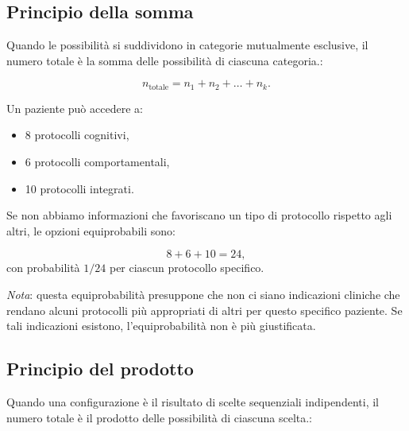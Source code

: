 \documentclass[
  italian,
  letterpaper,
  a4paper,
  11pt,
  open=any]{scrbook}
\providecommand{\tightlist}{%
  \setlength{\itemsep}{0pt}\setlength{\parskip}{0pt}}
\theoremstyle{plain}
\theoremstyle{definition}
\theoremstyle{definition}
\theoremstyle{remark}
\begin{document}
\subsection{Principio della somma}\label{principio-della-somma}

Quando le possibilità si suddividono in categorie mutualmente esclusive,
il numero totale è la somma delle possibilità di ciascuna categoria.:

\[
n_{\text{totale}} = n_1 + n_2 + \dots + n_k.
\]

\begin{tcolorbox}[enhanced jigsaw, arc=.35mm, bottomrule=.15mm, bottomtitle=1mm, breakable, colback=white, colbacktitle=quarto-callout-note-color!10!white, colframe=quarto-callout-note-color-frame, coltitle=black, left=2mm, leftrule=.75mm, opacityback=0, opacitybacktitle=0.6, rightrule=.15mm, title=\textcolor{quarto-callout-note-color}{\faInfo}\hspace{0.5em}{Esempio psicologico}, titlerule=0mm, toprule=.15mm, toptitle=1mm]

Un paziente può accedere a:

\begin{itemize}
\tightlist
\item
  8 protocolli cognitivi,
\item
  6 protocolli comportamentali,
\item
  10 protocolli integrati.
\end{itemize}

Se non abbiamo informazioni che favoriscano un tipo di protocollo
rispetto agli altri, le opzioni equiprobabili sono:

\[
8 + 6 + 10 = 24,
\] con probabilità \(1/24\) per ciascun protocollo specifico.

\emph{Nota}: questa equiprobabilità presuppone che non ci siano
indicazioni cliniche che rendano alcuni protocolli più appropriati di
altri per questo specifico paziente. Se tali indicazioni esistono,
l'equiprobabilità non è più giustificata.

\end{tcolorbox}

\subsection{Principio del prodotto}\label{principio-del-prodotto}

Quando una configurazione è il risultato di scelte sequenziali
indipendenti, il numero totale è il prodotto delle possibilità di
ciascuna scelta.:
\end{document}
